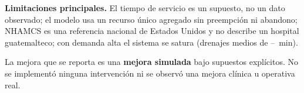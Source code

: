 \textbf{Limitaciones principales.} El tiempo de servicio es un supuesto, no un dato
observado; el modelo usa un recurso único agregado sin preempción ni abandono; NHAMCS es
una referencia nacional de Estados Unidos y no describe un hospital guatemalteco; con
demanda alta el sistema se satura (drenajes medios de \DrainBaseHigh{}--\DrainCandHigh{}~min).

\begin{alcance}
La mejora que se reporta es una \textbf{mejora simulada} bajo supuestos explícitos. No se
implementó ninguna intervención ni se observó una mejora clínica u operativa real.
\end{alcance}

\newpage
